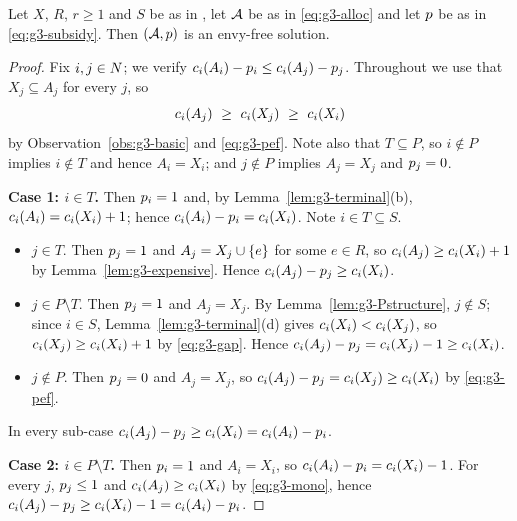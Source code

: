 \begin{theorem}
\label{thm:g3-completion}
Let $X$, $R$, $r \ge 1$ and $S$ be as in , let $\mathcal{A}$
be as in \eqref{eq:g3-alloc} and let $p$ be as in
\eqref{eq:g3-subsidy}. Then $(\mathcal{A},p)$ is an envy-free solution.
\end{theorem}
\begin{proof}
Fix $i,j \in N$; we verify
$c_i(A_i) - p_i \le c_i(A_j) - p_j$. Throughout we use
that $X_j \subseteq A_j$ for every $j$, so
\begin{equation}
\label{eq:g3-mono}
  c_i(A_j) \ \ge\ c_i(X_j) \ \ge\ c_i(X_i)
\end{equation}
by Observation~\ref{obs:g3-basic} and \eqref{eq:g3-pef}. Note also that
$T \subseteq P$, so $i \notin P$ implies $i \notin T$ and hence $A_i = X_i$;
and $j \notin P$ implies $A_j = X_j$ and $p_j = 0$.

\smallskip
\noindent\textbf{Case 1: $i \in T$.}
Then $p_i = 1$ and, by Lemma~\ref{lem:g3-terminal}(b),
$c_i(A_i) = c_i(X_i) + 1$; hence
$c_i(A_i) - p_i = c_i(X_i)$. Note $i \in T \subseteq S$.
\begin{itemize}
  \item[(1a)] $j \in T$. Then $p_j = 1$ and $A_j = X_j \cup \left\{e\right\}$
    for some $e \in R$, so $c_i(A_j) \ge c_i(X_i) + 1$ by
    Lemma~\ref{lem:g3-expensive}. Hence
    $c_i(A_j) - p_j \ge c_i(X_i)$.
  \item[(1b)] $j \in P \setminus T$. Then $p_j = 1$ and $A_j = X_j$.
    By Lemma~\ref{lem:g3-Pstructure}, $j \notin S$; since $i \in S$,
    Lemma~\ref{lem:g3-terminal}(d) gives $c_i(X_i) < c_i(X_j)$, so
    $c_i(X_j) \ge c_i(X_i) + 1$ by \eqref{eq:g3-gap}. Hence
    $c_i(A_j) - p_j = c_i(X_j) - 1 \ge c_i(X_i)$.
  \item[(1c)] $j \notin P$. Then $p_j = 0$ and $A_j = X_j$, so
    $c_i(A_j) - p_j = c_i(X_j) \ge c_i(X_i)$ by
    \eqref{eq:g3-pef}.
\end{itemize}
In every sub-case $c_i(A_j) - p_j \ge c_i(X_i) =
c_i(A_i) - p_i$.

\smallskip
\noindent\textbf{Case 2: $i \in P \setminus T$.}
Then $p_i = 1$ and $A_i = X_i$, so
$c_i(A_i) - p_i = c_i(X_i) - 1$. For every $j$,
$p_j \le 1$ and $c_i(A_j) \ge c_i(X_i)$ by
\eqref{eq:g3-mono}, hence
$c_i(A_j) - p_j \ge c_i(X_i) - 1 = c_i(A_i) - p_i$.


\end{proof}
